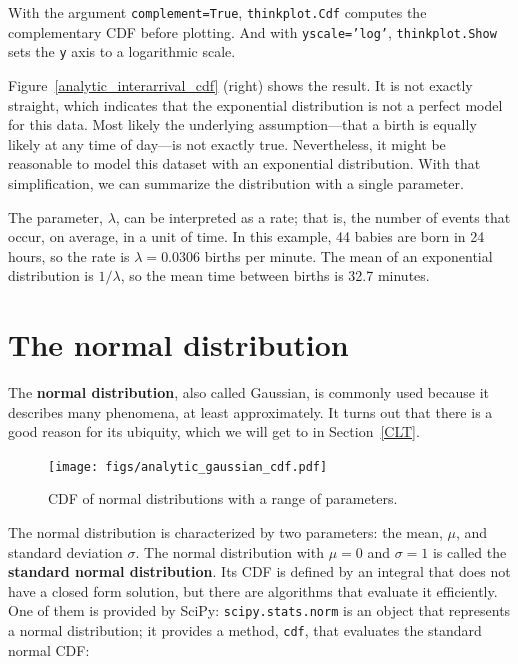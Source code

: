 \documentclass[12pt]{book}
\newcommand{\CDF}{\mathrm{CDF}}
\theoremstyle{exercise}
\begin{document}
With the argument {\tt complement=True}, {\tt thinkplot.Cdf} computes
the complementary CDF before plotting.  And with {\tt yscale='log'},
{\tt thinkplot.Show} sets the {\tt y} axis to a logarithmic scale.%
%

Figure~\ref{analytic_interarrival_cdf} (right) shows the result.  It is not
exactly straight, which indicates that the exponential distribution is
not a perfect model for this data.  Most likely the underlying
assumption---that a birth is equally likely at any time of day---is
not exactly true.  Nevertheless, it might be reasonable to model this
dataset with an exponential distribution.  With that simplification, we can
summarize the distribution with a single parameter.%

The parameter, $\lambda$, can be interpreted as a rate; that is, the
number of events that occur, on average, in a unit of time.  In this
example, 44 babies are born in 24 hours, so the rate is $\lambda =
0.0306$ births per minute.  The mean of an exponential distribution is
$1/\lambda$, so the mean time between births is 32.7 minutes.


\section{The normal distribution}%
\label{normal}

The {\bf normal distribution}, also called Gaussian, is commonly
used because it describes many phenomena, at least approximately.
It turns out that there is a good reason for its ubiquity, which we
will get to in Section~\ref{CLT}.%
%
%
%
%
%
%
%

%
%

\begin{figure}
\centerline{\texttt{[image: figs/analytic\_gaussian\_cdf.pdf]}}
\caption{CDF of normal distributions with a range of parameters.}%
\label{analytic_gaussian_cdf}
\end{figure}

The normal distribution is characterized by two parameters: the mean,
$\mu$, and standard deviation $\sigma$.  The normal distribution with
$\mu=0$ and $\sigma=1$ is called the {\bf standard normal
  distribution}.  Its CDF is defined by an integral that does not have
a closed form solution, but there are algorithms that evaluate it
efficiently.  One of them is provided by SciPy: {\tt scipy.stats.norm}
is an object that represents a normal distribution; it provides a
method, {\tt cdf}, that evaluates the standard normal CDF:%
%
\end{document}
